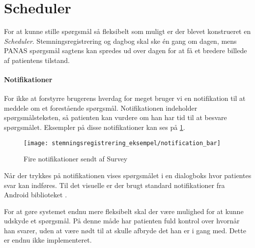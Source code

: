 \section{Scheduler}
For at kunne stille spørgsmål så fleksibelt som muligt er der blevet konstrueret en \textit{Scheduler}.
Stemningsregistrering og dagbog skal ske én gang om dagen, mens PANAS spørgsmål sagtens kan spredes ud over dagen for at få et bredere billede af patientens tilstand.


\paragraph{Notifikationer}
For ikke at forstyrre brugerens hverdag for meget bruger vi en notifikation til at meddele om et forestående spørgsmål.
Notifikationen indeholder spørgsmålsteksten, så patienten kan vurdere om han har tid til at besvare spørgsmålet.
Eksempler på disse notifikationer kan ses på \cref{noti}.

\begin{figure}
	\centering
	\texttt{[image: stemningsregistrering\_eksempel/notification\_bar]}
	\caption{Fire notifikationer sendt af Survey}\label{noti}
\end{figure}

Når der trykkes på notifikationen vises spørgsmålet i en dialogboks hvor patientes svar kan indføres.
Til det visuelle er der brugt standard notifikationer fra Android biblioteket \cite{android_notifications}.

For at gøre systemet endnu mere fleksibelt skal der være mulighed for at kunne udskyde et spørgsmål.
På denne måde har patienten fuld kontrol over hvornår han svarer, uden at være nødt til at skulle afbryde det han er i gang med.
Dette er endnu ikke implementeret.
